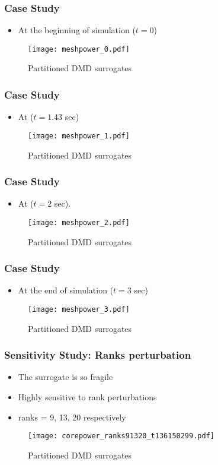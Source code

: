 \documentclass[fleqn]{beamer}
\begin{document}
\begin{frame}
\frametitle{Case Study}
\begin{itemize}
	\item At the beginning of simulation ($t=0$)
\end{itemize}
\begin{figure}
\texttt{[image: meshpower\_0.pdf]}
\caption{Partitioned DMD surrogates}
\end{figure}
\end{frame}

\begin{frame}
\frametitle{Case Study}
\begin{itemize}
	\item At ($t=1.43$ sec)
\end{itemize}
\begin{figure}[ht]
\texttt{[image: meshpower\_1.pdf]}
\caption{Partitioned DMD surrogates}
\end{figure}
\end{frame}

\begin{frame}
\frametitle{Case Study}
\begin{itemize}
	\item At ($t=2$ sec).
\end{itemize}
\begin{figure}
\texttt{[image: meshpower\_2.pdf]}
\caption{Partitioned DMD surrogates}
\end{figure}
\end{frame}

\begin{frame}
\frametitle{Case Study}
\begin{itemize}
	\item At the end of simulation ($t=3$ sec)
\end{itemize}
\begin{figure}[ht]
\texttt{[image: meshpower\_3.pdf]}
\caption{Partitioned DMD surrogates}
\end{figure}
\end{frame}

\begin{frame}
\frametitle{Sensitivity Study: Ranks perturbation}
\begin{itemize}
 \item The surrogate is so fragile
 \item Highly sensitive to rank perturbations
 \item ranks = 9, 13, 20 respectively
\end{itemize}

\begin{figure}[ht]

\texttt{[image: corepower\_ranks91320\_t136150299.pdf]}
\caption{Partitioned DMD surrogates}
\end{figure}
\end{frame}
\end{document}
